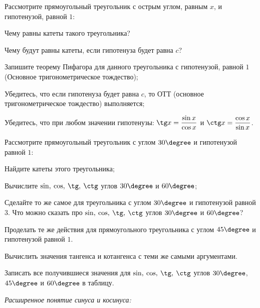 \begin{class}[number=1]
	\begin{listofex}
		\item Рассмотрите прямоугольный треугольник с острым углом, равным \( x \), и гипотенузой, равной \( 1 \):
		\begin{enumcols}
			\item Чему равны катеты такого треугольника?
			\item Чему будут равны катеты, если гипотенуза будет равна \( c \)?
			\item Запишите теорему Пифагора для данного треугольника с гипотенузой, равной \( 1 \) (Основное тригонометрическое тождество);
			\item Убедитесь, что если гипотенуза будет равна \( c \), то ОТТ (основное тригонометрическое тождество) выполняется;
			\item Убедитесь, что при любом значении гипотенузы: \( \tg x = \dfrac{\sin x}{\cos x} \) и \( \ctg x = \dfrac{\cos x}{\sin x} \).
		\end{enumcols}
		\item Рассмотрите прямоугольный треугольник с углом \( 30\degree \) и гипотенузой равной \( 1 \):
		\begin{enumcols}
			\item Найдите катеты этого треугольника;
			\item Вычислите \( \sin,\:\cos,\:\tg,\:\ctg \) углов \( 30\degree \) и \( 60\degree \);
			\item Сделайте то же самое для треугольника с углом \( 30\degree \) и гипотенузой равной \( 3 \). Что можно сказать про \( \sin,\:\cos,\:\tg,\:\ctg \) углов \( 30\degree \) и \( 60\degree \)?
		\end{enumcols}
		\item Проделать те же действия для прямоугольного треугольника с углом \( 45\degree \) и гипотенузой равной \( 1 \).
		\item Вычислить значения тангенса и котангенса с теми же самыми аргументами.
		\item Записать все получившиеся значения для \( \sin,\:\cos,\:\tg,\:\ctg \) углов \( 30\degree \), \( 45\degree \) и \( 60\degree \) в таблицу.
		\item \textit{Расширенное понятие синуса и косинуса:}\\[0.5em]
\end{listofex}
\end{class}
